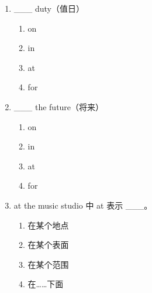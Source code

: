 \documentclass[11pt,a4paper]{ctexart}
\begin{document}
\begin{enumerate}[leftmargin=*,itemsep=4pt]
\item \_\_\_ duty（值日）
\begin{enumerate}[label=\Alph*.,leftmargin=2em,itemsep=1pt,topsep=2pt]
\item on
\item in
\item at
\item for
\end{enumerate}
\item \_\_\_ the future（将来）
\begin{enumerate}[label=\Alph*.,leftmargin=2em,itemsep=1pt,topsep=2pt]
\item on
\item in
\item at
\item for
\end{enumerate}
\item at the music studio 中 at 表示 \_\_\_。
\begin{enumerate}[label=\Alph*.,leftmargin=2em,itemsep=1pt,topsep=2pt]
\item 在某个地点
\item 在某个表面
\item 在某个范围
\item 在……下面
\end{enumerate}
\end{enumerate}

\newpage
\end{document}
